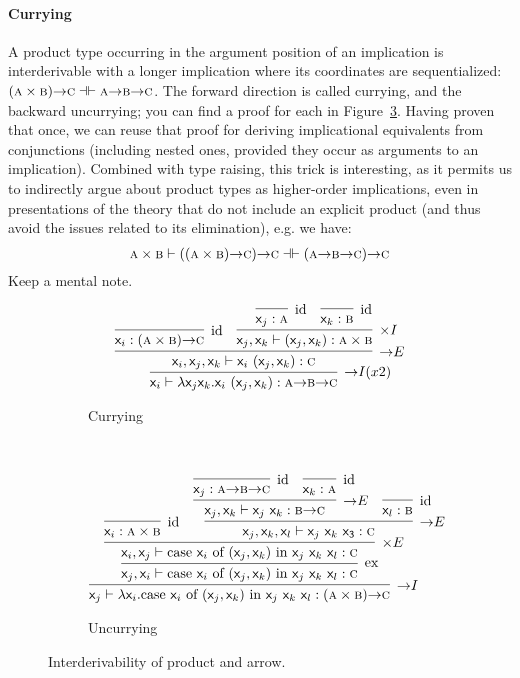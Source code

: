 \paragraph{Currying}
A product type occurring in the argument position of an implication is interderivable with a longer implication where its coordinates are sequentialized: $(\smallprop{a}\times\smallprop{b}) \ii \smallprop{c} \dashv \vdash \smallprop{a} \ii \smallprop{b} \ii \smallprop{c}$.
The forward direction is called currying, and the backward uncurrying; you can find a proof for each in Figure~\ref{figure:curry_uncurry}.
Having proven that once, we can reuse that proof for deriving implicational equivalents from conjunctions (including nested ones, provided they occur as arguments to an implication).
Combined with type raising, this trick is interesting, as it permits us to indirectly argue about product types as higher-order implications, even in presentations of the theory that do not include an explicit product (and thus avoid the issues related to its elimination), e.g. we have:
\begin{equation}
	\prop{a} \times \prop{b} \vdash ((\prop{a} \times \prop{b}) \ii \prop{c}) \ii \prop{c} \dashv \vdash (\prop{a} \ii \prop{b} \ii \prop{c}) \ii \prop{c}
\end{equation}
Keep a mental note.

\begin{figure}
	\centering
	\begin{subfigure}{1\textwidth}
		\[
		\infer[\ii I (x2)]{\vari \vdash \lam \varj\vark.\vari~(\varj, \vark): \prop{a} \ii \prop{b} \ii \prop{c}}{
			\infer[\ii E]{\vari, \varj, \vark \vdash \vari~(\varj, \vark): \prop{c}}{
				\infer[\Ax]{\vari: (\prop{a} \times \prop{b}) \ii \prop{c}}{}
				&
				\infer[\times I]{\varj, \vark \vdash (\varj, \vark): \prop{a} \times \prop{b}}{
					\infer[\Ax]{\varj: \prop{a}}{}
					&			
					\infer[\Ax]{\vark: \prop{b}}{}
				}
			}
		}
		\]
		\caption{Currying}
		\label{subfigure:currying}
	\end{subfigure}\\[\midsep]
	\begin{subfigure}{1\textwidth}
		\[
			\infer[\ii I]{\varj \vdash \term{\lam \vari.}\caseof{\vari}{(\varj,\vark)}{\varj~\vark~\varl}:(\prop{a} \times \prop{b})\ii \prop{c}}{
				\infer[\Exchange{}]{\varj, \vari  \vdash \caseof{\vari}{(\varj,\vark)}{\varj~\vark~\varl}:\prop{c}}{
					\infer[\times E]{\vari, \varj \vdash \caseof{\vari}{(\varj,\vark)}{\varj~\vark~\varl}:\prop{c}}{
						\infer[\Ax]{\vari: \prop{a} \times \prop{b}}{}
						&
						\infer[\ii E]{\varj, \vark, \varl \vdash \term{\varj~\vark~x_3}: \prop{c}}{
							\infer[\ii E]{\varj, \vark \vdash \term{\varj~\vark}: \prop{b} \ii \prop{c}}{
								\infer[\Ax]{\varj: \prop{a} \ii \prop{b} \ii \prop{c}}{}
								&
								\infer[\Ax]{\vark: \prop{a}}{}
							}
							&
							\infer[\Ax]{\varl: \prop{b}}{}
						}
					}
				}
			}
		\]
		\caption{Uncurrying}
		\label{subfigure:uncurrying}
	\end{subfigure}
	\caption{Interderivability of product and arrow.}
	\label{figure:curry_uncurry}
\end{figure}

